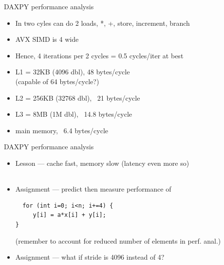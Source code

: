 \begin{frame}[fragile]{DAXPY performance analysis}
  \begin{itemize}
  \item In two cyles can do 2 loads, *, +, store, increment, branch
  \item AVX SIMD is 4 wide
  \item Hence, 4 iterations per 2 cycles = 0.5 cycles/iter at best
  \item L1 = 32KB (4096 dbl), 48 bytes/cycle \\
  (capable of 64 bytes/cycle?)
  \item L2 = 256KB (32768 dbl), ~21 bytes/cycle
  \item L3 = 8MB (1M dbl), ~14.8 bytes/cycle
  \item main memory, ~6.4 bytes/cycle
  \end{itemize}
  
\end{frame}

\begin{frame}[fragile]{DAXPY performance analysis}
  \begin{itemize}
  \item Lesson --- cache fast, memory slow (latency even more so)
  \\
  \ 
  \item Assignment --- predict then measure performance of
\begin{verbatim}
  for (int i=0; i<n; i+=4) {
     y[i] = a*x[i] + y[i];
}
\end{verbatim}
  (remember to account for reduced number of elements in perf. anal.)
  \item Assignment --- what if stride is 4096 instead of 4?
  \end{itemize}
  
\end{frame}

